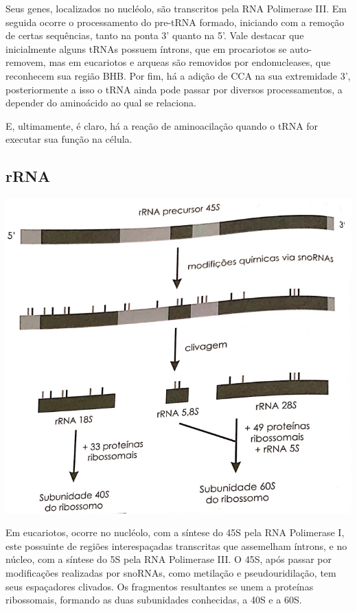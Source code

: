 \documentclass[
]{book}
\begin{document}
Seus genes, localizados no nucléolo, são transcritos pela RNA Polimerase III. Em seguida ocorre o processamento do pre-tRNA formado, iniciando com a remoção de certas sequências, tanto na ponta 3' quanto na 5'. Vale destacar que inicialmente alguns tRNAs possuem íntrons, que em procariotos se auto-removem, mas em eucariotos e arqueas são removidos por endonucleases, que reconhecem sua região BHB. Por fim, há a adição de CCA na sua extremidade 3', posteriormente a isso o tRNA ainda pode passar por diversos processamentos, a depender do aminoácido ao qual se relaciona.

E, ultimamente, é claro, há a reação de aminoacilação quando o tRNA for executar sua função na célula.

\hypertarget{rrna}{%
\subsection{rRNA}\label{rrna}}

\includegraphics{./pics/rRNA synthesis.png}

Em eucariotos, ocorre no nucléolo, com a síntese do 45S pela RNA Polimerase I, este possuinte de regiões interespaçadas transcritas que assemelham íntrons, e no núcleo, com a síntese do 5S pela RNA Polimerase III. O 45S, após passar por modificações realizadas por snoRNAs, como metilação e pseudouridilação, tem seus espaçadores clivados. Os fragmentos resultantes se unem a proteínas ribossomais, formando as duas subunidades conhecidas, a 40S e a 60S.
\end{document}
